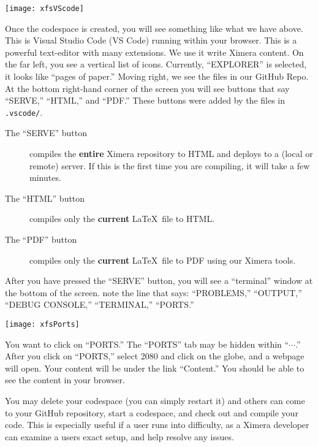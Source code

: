 \documentclass{ximera}
\begin{document}
\begin{image}
    \texttt{[image: xfsVScode]}
\end{image}
        Once the codespace is created, you will see something like what we have
        above. This is Visual Studio Code (VS Code) running within your browser. This
        is a powerful text-editor with many extensions. We use it write Ximera content.
        On the far left, you see a vertical list of icons. Currently, ``EXPLORER'' is
        selected, it looks like ``pages of paper.'' Moving right, we see the files in
        our GitHub Repo. At the bottom right-hand corner of the screen you will see
        buttons that say ``SERVE,''  ``HTML,'' and ``PDF.'' These buttons were added by the files
        in \verb!.vscode/!.
        \begin{description}
            \item[The ``SERVE'' button] compiles the \textbf{entire} Ximera repository to HTML and deploys to a (local or remote) server. If this is the first time you are compiling, it will take a few minutes.
        \item[The ``HTML'' button] compiles only the \textbf{current} \LaTeX\ file to HTML.
        \item[The ``PDF'' button] compiles only the \textbf{current} \LaTeX\ file to PDF using our Ximera tools.
        \end{description}
    After you have pressed the ``SERVE'' button, you will see a
        ``terminal'' window at the bottom of the screen. 
        note the line that says: ``PROBLEMS,'' ``OUTPUT,'' ``DEBUG CONSOLE,''
        ``TERMINAL,'' ``PORTS.''
        \pdfOnly{\end{multicols*}}

\newpage

\begin{image}
    \texttt{[image: xfsPorts]}
\end{image}
        You want
        to click on ``PORTS.'' The ``PORTS'' tab may be hidden within
        ``$\cdots$.''
        After you click on ``PORTS,'' select 2080 and click on the globe, and a
        webpage
        will open. Your
        content will be under the link ``Content.'' You should be able to see
        the
        content in your browser.

        You may delete your codespace (you can simply restart it) and others
        can come
        to your GitHub repository, start a codespace, and check out and compile
        your
        code.
        This is especially useful if a user runs into difficulty, as a Ximera
        developer
        can examine a users exact setup, and help resolve any issues.
\end{document}
